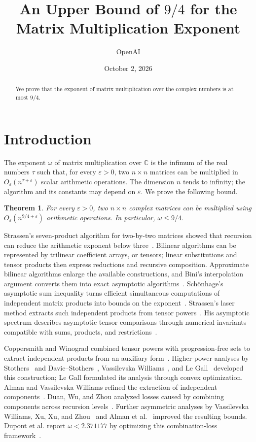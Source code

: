 \documentclass[11pt]{article}
\title{An Upper Bound of $9/4$ for the\\Matrix Multiplication Exponent}
\author{OpenAI}
\date{October 2, 2026}
\newtheorem{theorem}{Theorem}[section]
\theoremstyle{definition}
\theoremstyle{remark}
\newcommand{\C}{\mathbb C}
\newcommand{\eps}{\varepsilon}
\numberwithin{equation}{section}
\begin{document}
\maketitle

\begin{abstract}
We prove that the exponent of matrix multiplication over the complex
numbers is at most $9/4$.
\end{abstract}

\section{Introduction}\label{sec:intro}

The exponent $\omega$ of matrix multiplication over $\C$ is the infimum
of the real numbers $\tau$ such that, for every $\eps>0$, two $n\times n$
matrices can be multiplied in $O_\eps(n^{\tau+\eps})$ scalar arithmetic
operations. The dimension $n$ tends to infinity; the algorithm and its
constants may depend on $\eps$. We prove the following bound.

\begin{theorem}\label{thm:main}
For every $\eps>0$, two $n\times n$ complex matrices can be multiplied
using $O_\eps(n^{9/4+\eps})$ arithmetic operations. In particular,
$\omega\leq9/4$.
\end{theorem}

Strassen's seven-product algorithm for two-by-two matrices showed
that recursion can reduce the arithmetic exponent below
three~\cite{Str69}. Bilinear algorithms can be represented by
trilinear coefficient arrays, or tensors; linear substitutions and
tensor products then express reductions and recursive composition.
Approximate bilinear algorithms enlarge the available constructions,
and Bini's interpolation argument converts them into exact asymptotic
algorithms~\cite{Bini80}. Sch\"onhage's asymptotic sum inequality turns
efficient simultaneous computations of independent matrix products
into bounds on the exponent~\cite{Sch81}. Strassen's laser method
extracts such independent products from tensor powers~\cite{Str86,Str87}.
His asymptotic spectrum describes asymptotic tensor comparisons through numerical
invariants compatible with sums, products, and
restrictions~\cite{Str88,CVZ}.

Coppersmith and Winograd combined tensor powers with progression-free
sets to extract independent products from an auxiliary
form~\cite{CW90}. Higher-power analyses by
Stothers~\cite{Sto10} and Davie--Stothers~\cite{DS13},
Vassilevska Williams~\cite{VW12}, and Le Gall~\cite{LG14}
developed this construction; Le Gall formulated its analysis through
convex optimization. Alman and Vassilevska Williams refined the
extraction of independent components~\cite{AW21}.
Duan, Wu, and Zhou analyzed losses caused by combining components
across recursion levels~\cite{DWZ23}. Further asymmetric analyses
by Vassilevska Williams, Xu, Xu, and Zhou~\cite{VXXZ24} and
Alman et al.~\cite{AD25} improved the resulting bounds.
Dupont et al. report $\omega<2.371177$ by optimizing this
combination-loss framework~\cite{Dup26}.
\end{document}
